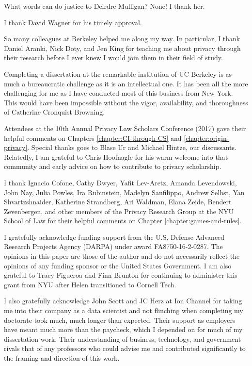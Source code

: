 \documentclass[../thesis.tex]{subfiles}
\begin{document}
 What words can do justice to Deirdre Mulligan?
 None!
 I thank her.

 I thank David Wagner for his timely approval.

 So many colleagues at Berkeley helped me along my way.
 In particular, I thank Daniel Aranki, Nick Doty, and Jen King
 for teaching me about privacy through their research
 before I ever knew I would join them in their field
 of study.

 Completing a dissertation at the remarkable institution
 of UC Berkeley is as much a bureaucratic challenge as it
 is an intellectual one.
 It has been all the more challenging for me as I
 have conducted most of this business from New York.
 This would have been impossible without the vigor,
 availability, and thoroughness of Catherine
 Cronquist Browning.
 
 Attendees at the 10th Annual Privacy Law Scholars Conference
 (2017) gave their helpful comments on
 Chapters \ref{chapter:CI-through-CS} and
 \ref{chapter:origin-privacy}.
 Special thanks goes to Blase Ur and Michael Hintze,
 our discussants.
 Relatedly, I am grateful to Chris Hoofnagle for his warm
 welcome into that community and early advice
 on how to contribute to privacy scholarship.

 I thank Ignacio Cofone, Cathy Dwyer, Yafit Lev-Aretz,
 Amanda Levendowski, John Nay, Julia Powles,
 Ira Rubinstein, Madelyn Sanfilippo, Andrew Selbst,
 Yan Shvartzshnaider,
 Katherine Strandberg, Ari Waldman, Elana Zeide,
 Bendert Zevenbergen,  
 and other members of the Privacy Research Group at
 the NYU School of Law for their helpful comments
 on Chapter \ref{chapter:games-and-rules}.
 
 I gratefully acknowledge funding support 
 from the U.S. Defense Advanced Research Projects Agency (DARPA)
 under award FA8750-16-2-0287.
 The opinions in this paper are those of the author and do not
 necessarily reflect the opinions of any funding sponsor
 or the United States Government.
 I am also grateful to Tracy Figueroa and Finn Brunton
 for continuing to administer this grant from NYU after
 Helen transitioned to Cornell Tech.
 
 I also gratefully acknowledge John Scott and JC Herz
 at Ion Channel
 for taking me into their company as a data scientist and
 not flinching when completing my doctorate took much,
 much longer than expected.
 Their support as employers have meant much more than the paycheck,
 which I depended on for much of my dissertation work.
 Their understanding of business, technology, and government
 rivals that of any professors who could advise me
 and contributed significantly to the framing and direction
 of this work.
\end{document}
